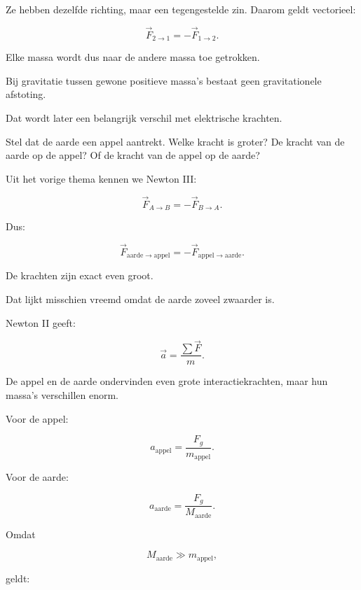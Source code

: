 \documentclass{ximera}
\begin{document}
Ze hebben dezelfde richting, maar een tegengestelde zin. Daarom geldt
vectorieel:

\[
\boxed{
\vec F_{2\to1}=-\vec F_{1\to2}.
}
\]

Elke massa wordt dus naar de andere massa toe getrokken.

\begin{opmerking}

Bij gravitatie tussen gewone positieve massa's bestaat geen
gravitationele afstoting.

Dat wordt later een belangrijk verschil met elektrische krachten.

\end{opmerking}




Stel dat de aarde een appel aantrekt. Welke kracht is groter? De kracht van de aarde op de appel? Of de kracht van de appel op de aarde?

Uit het vorige thema kennen we Newton III:

\[
\boxed{
\vec F_{A\rightarrow B}
=
-\vec F_{B\rightarrow A}.
}
\]

Dus:

\[
\boxed{
\vec F_{\mathrm{aarde}\rightarrow\mathrm{appel}}
=
-
\vec F_{\mathrm{appel}\rightarrow\mathrm{aarde}}.
}
\]

De krachten zijn exact even groot.

Dat lijkt misschien vreemd omdat de aarde zoveel zwaarder is.



Newton II geeft:

\[
\vec a=\frac{\sum\vec F}{m}.
\]

De appel en de aarde ondervinden even grote interactiekrachten, maar hun
massa's verschillen enorm.

Voor de appel:

\[
a_\mathrm{appel}
=
\frac{F_g}{m_\mathrm{appel}}.
\]

Voor de aarde:

\[
a_\mathrm{aarde}
=
\frac{F_g}{M_\mathrm{aarde}}.
\]

Omdat

\[
M_\mathrm{aarde}
\gg
m_\mathrm{appel},
\]

geldt:
\end{document}
